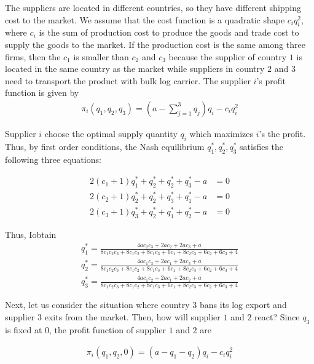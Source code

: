 \documentclass[a4paper,12pt]{article}
\begin{document}
The suppliers are located in different countries, so they have different shipping cost to the market. We assume that the cost function is a quadratic shape $c_{i} q_i ^ 2$, where $c_i$ is the sum of production cost to produce the goods and trade cost to supply the goods to the market. If the production cost is the same among three firms, then the $c_1$ is smaller than $c_2$ and $c_3$ because the supplier of country $1$ is located in the same country as the market while suppliers in country $2$ and $3$ need to transport the product with bulk log carrier. The supplier $i$'s profit function is given by 
\begin{align}
    \pi_i (q_1, q_2, q_3) = \left( a - \sum_{j=1}^3 q_{j} \right) q_{i} - c_{i} q_i ^ 2 
\end{align}

Supplier $i$ choose the optimal supply quantity $q_i$ which maximizes $i$'s the profit. Thus, by first order conditions, the Nash equilibrium $q_1^*, q_2^*, q_3^*$ satisfies the following three equations:

\begin{align}
    2(c_1 + 1) q_1^* + q_2 ^* + q_2 ^ * + q_3 ^ * - a &= 0 \\
    2(c_2 + 1) q_2^* + q_2 ^* + q_3 ^ * + q_1 ^ * - a &= 0 \\
    2(c_3 + 1) q_3^* + q_2 ^* + q_1 ^ * + q_2 ^ * - a &= 0
\end{align}

Thus, Iobtain 
\begin{align}
    q_1^* = \frac{4 a c_{2} c_{3} + 2 a c_{2} + 2 a c_{3} + a}{8 c_{1} c_{2} c_{3} + 8 c_{1} c_{2} + 8 c_{1} c_{3} + 6 c_{1} + 8 c_{2} c_{3} + 6 c_{2} + 6 c_{3} + 4} \\
    q_2^* = \frac{4 a c_{1} c_{3} + 2 a c_{1} + 2 a c_{3} + a}{8 c_{1} c_{2} c_{3} + 8 c_{1} c_{2} + 8 c_{1} c_{3} + 6 c_{1} + 8 c_{2} c_{3} + 6 c_{2} + 6 c_{3} + 4} \\
    q_3^* = \frac{4 a c_{1} c_{2} + 2 a c_{1} + 2 a c_{2} + a}{8 c_{1} c_{2} c_{3} + 8 c_{1} c_{2} + 8 c_{1} c_{3} + 6 c_{1} + 8 c_{2} c_{3} + 6 c_{2} + 6 c_{3} + 4}
\end{align}

Next, let us consider the situation where country $3$ bans its log export and supplier $3$ exits from the market. Then, how will supplier $1$ and $2$ react? Since $q_3$ is fixed at $0$, the profit function of supplier $1$ and $2$ are 

\begin{align}
    \pi_i (q_1, q_2, 0) = (a - q_1 - q_2) q_{i} - c_{i} q_i ^ 2 
\end{align}
\end{document}
